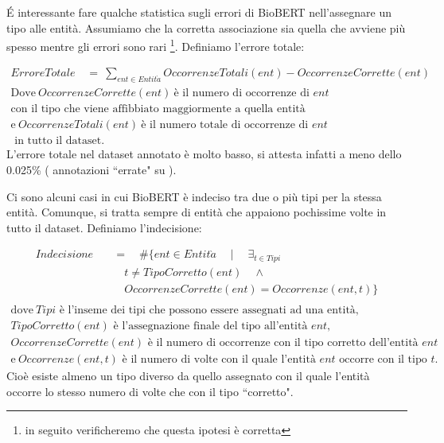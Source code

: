 \documentclass[12pt]{report}
\newcommand{\quotes}[1]{``#1"}
\begin{document}
\'E interessante fare qualche statistica sugli errori di BioBERT nell'assegnare un tipo alle entità. Assumiamo che la corretta associazione sia quella che avviene più spesso mentre gli errori sono rari \footnote{in seguito verificheremo che questa ipotesi è corretta}. Definiamo l'errore totale:

\begin{gather}
    ErroreTotale\quad =\ \sum_{ent \in Entit\grave{a}} OccorrenzeTotali(ent) - OccorrenzeCorrette(ent) \\
    \nonumber \mbox{Dove} \ OccorrenzeCorrette(ent) \ \mbox{è il numero di occorrenze di } ent \\ 
    \nonumber \mbox{con il tipo che viene affibbiato maggiormente a quella entità}\\
    \nonumber \mbox{e} \ OccorrenzeTotali(ent) \ \mbox{è il numero totale di occorrenze di } ent\\
    \nonumber \mbox{ in tutto il dataset.} 
\end{gather}
L'errore totale nel dataset annotato è  molto basso, si attesta infatti a meno dello 0.025\% ( annotazioni \quotes{errate} su ).

Ci sono alcuni casi in cui BioBERT è indeciso tra due o più tipi per la stessa entità. Comunque, si tratta sempre di entità che appaiono pochissime volte in tutto il dataset. Definiamo l'indecisione:

\begin{equation}
    \begin{aligned}
    Indecisione \quad & =\quad  \#\{ent \in Entit\grave{a}  \quad \mid \quad \exists_{t \in Tipi} \\
    & \quad t \neq TipoCorretto(ent) \quad\land \\
    & \quad OccorrenzeCorrette(ent) = Occorrenze(ent, t)\}\\
    \end{aligned}
\end{equation}
\begin{gather}
    \nonumber \mbox{dove}\ Tipi \mbox{ è l'inseme dei tipi che possono essere assegnati ad una entità}, \\
    \nonumber TipoCorretto(ent) \mbox{ è l'assegnazione finale del tipo all'entità } ent ,\\
    \nonumber OccorrenzeCorrette(ent) \mbox{ è il numero di occorrenze con il tipo corretto dell'entità } ent \\
    \nonumber \mbox{e} \ Occorrenze(ent,t) \mbox{ è il numero di volte con il quale l'entità } ent \mbox{ occorre con il tipo } t. 
\end{gather}
Cioè esiste almeno un tipo diverso da quello assegnato con il quale l'entità occorre lo stesso numero di volte che con il tipo \quotes{corretto}. 
\end{document}
